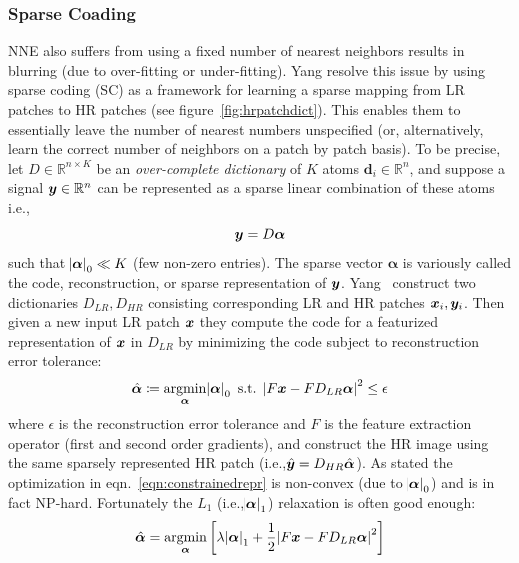 \subsubsection{Sparse Coading}\label{subsubsec:sparsecoding}
NNE also suffers from using a fixed number of nearest neighbors results in blurring (due to over-fitting or under-fitting).
%
Yang \etal\cite{yang2008} resolve this issue by using sparse coding (SC) as a framework for learning a sparse mapping from LR patches to HR patches (see figure~\ref{fig:hrpatchdict}).
%
This enables them to essentially leave the number of nearest numbers unspecified (or, alternatively, learn the correct number of neighbors on a patch by patch basis).
%
To be precise, let \(D \in \mathbb{R}^{n \times K}\) be an \textit{over-complete dictionary} of \(K\) atoms \(\bm{d}_i \in \mathbb{R}^n\), and suppose a signal \(\bm{y} \in \mathbb{R}^n\) can be represented as a sparse linear combination of these atoms i.e.,\begin{equation}
    \bm{y} = D\bm{\alpha}
\end{equation}
such that \(\abs{ \bm{\alpha} }_0 \ll K\) (few non-zero entries).
%
The sparse vector \(\bm{\alpha}\) is variously called the code, reconstruction, or sparse representation of \(\bm{y}\).
%
Yang \etal~construct two dictionaries \(D_{LR}, D_{HR}\) consisting corresponding LR and HR patches \(\bm{x}_i, \bm{y}_i\).
%
Then given a new input LR patch \(\bm{x}\) they compute the code for a featurized representation of \(\bm{x}\) in \(D_{LR}\) by minimizing the code subject to reconstruction error tolerance:
\begin{equation}
    \hat{\bm{\alpha}} \coloneqq \underset{\bm{\alpha}}{\text{argmin}} \abs{ \bm{\alpha} }_0 \text{ s.t. } \abs{ F\bm{x} - FD_{LR}\bm{\alpha} }^2 \leq \epsilon
    \label{eqn:constrainedrepr}
\end{equation}
where \(\epsilon\) is the reconstruction error tolerance and \(F\) is the feature extraction operator (first and second order gradients), and construct the HR image using the same sparsely represented HR patch (i.e.,\(\hat{\bm{y}} = D_{HR} \hat{\bm{\alpha}}\)).
%
As stated the optimization in eqn.~\eqref{eqn:constrainedrepr} is non-convex (due to \(\abs{ \bm{\alpha} }_0\)) and is in fact NP-hard\cite{tilman2015}.
%
Fortunately the \(L_1\) (i.e.,\(\abs{ \bm{\alpha} }_1\)) relaxation is often good enough\cite{Donoho9446}:
\begin{equation}
    \hat{\bm{\alpha}} = \underset{\bm{\alpha}}{\text{argmin}} \left[ \lambda\abs{ \bm{\alpha} }_1 + \frac{1}{2}\abs{ F\bm{x} - FD_{LR}\bm{\alpha} }^2 \right]
    \label{eqn:lagrangerepr}
\end{equation}
